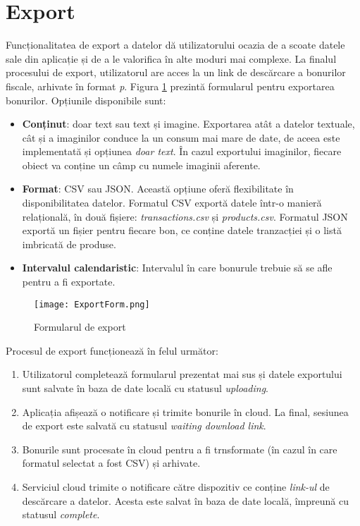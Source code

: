 \section{Export}

Funcționalitatea de export a datelor dă utilizatorului ocazia de a scoate datele sale din aplicație și de a le valorifica în alte moduri mai complexe. La finalul procesului de export, utilizatorul are acces la un link de descărcare a bonurilor fiscale, arhivate în format \emph{p}. Figura \ref{exportForm} prezintă formularul pentru exportarea bonurilor. Opțiunile disponibile sunt:

\begin{itemize}
  \item
    \textbf{Conținut}: doar text sau text și imagine. Exportarea atât a datelor textuale, cât și a imaginilor conduce la un consum mai mare de date, de aceea este implementată și opțiunea \emph{doar text}. În cazul exportului imaginilor, fiecare obiect va conține un câmp cu numele imaginii aferente.
  \item
    \textbf{Format}: CSV sau JSON. Această opțiune oferă flexibilitate în disponibilitatea datelor. Formatul CSV exportă datele într-o manieră relațională, în două fișiere: \emph{transactions.csv} și \emph{products.csv}. Formatul JSON exportă un fișier pentru fiecare bon, ce conține datele tranzacției și o listă imbricată de produse.
  \item
    \textbf{Intervalul calendaristic}: Intervalul în care bonurule trebuie să se afle pentru a fi exportate.
\end{itemize}

\begin{figure}[ht]
  \centering
  \texttt{[image: ExportForm.png]}
  \caption{Formularul de export}
  \label{exportForm}
\end{figure}

Procesul de export funcționează în felul următor:

\begin{enumerate}
\item
  Utilizatorul completează formularul prezentat mai sus și datele exportului sunt salvate în baza de date locală cu statusul \emph{uploading}.
\item
  Aplicația afișează o notificare și trimite bonurile în cloud. La final, sesiunea de export este salvată cu statusul \emph{waiting download link}.
\item
  Bonurile sunt procesate în cloud pentru a fi trnsformate (în cazul în care formatul selectat a fost CSV) și arhivate.
\item
  Serviciul cloud trimite o notificare către dispozitiv ce conține \emph{link-ul} de descărcare a datelor. Acesta este salvat în baza de date locală, împreună cu statusul \emph{complete}.
\end{enumerate}

